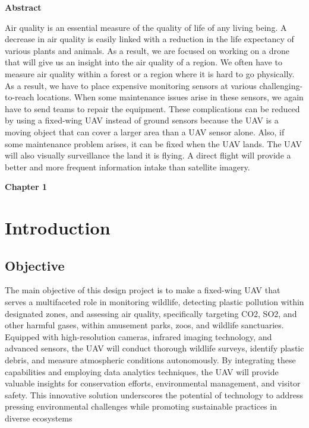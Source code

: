 \documentclass[12 pt]{article}
\begin{document}
\newpage

\vspace{\fill}
\noindent

\begin{midpage}
    \centering
\textbf{Abstract} \\ \vspace{0.5 cm}

Air quality is an essential measure of the quality of life of any living being. A decrease in air quality is easily linked with a reduction in the life expectancy of various plants and animals.
As a result, we are focused on working on a drone that will give us an insight into the air quality of a region. 
We often have to measure air quality within a forest or a region where it is hard to go physically. As a result, we have to place expensive monitoring sensors at various challenging-to-reach locations. 
When some maintenance issues arise in these sensors, we again have to send teams to repair the equipment.
These complications can be reduced by using a fixed-wing UAV instead of ground sensors because the UAV is a moving object that can cover a larger area than a UAV sensor alone. Also, if some maintenance problem arises, it can be fixed when the UAV lands.
The UAV will also visually surveillance the land it is flying. A direct flight will provide a better and more frequent information intake than satellite imagery.
\end{midpage}

\vspace{\fill}


\newpage

\tableofcontents

\newpage

\thispagestyle{empty}
\listoffigures
\listoftables
\newpage

\textbf{\Huge{Chapter 1}}
\section{Introduction}

\subsection{Objective}
The main objective of this design project is to make a fixed-wing UAV that serves a multifaceted role in monitoring wildlife, detecting plastic pollution within designated zones, and assessing air quality, specifically targeting CO2, SO2, and other harmful gases, within amusement parks, zoos, and wildlife sanctuaries. Equipped with high-resolution cameras, infrared imaging technology, and advanced sensors, the UAV will conduct thorough wildlife surveys, identify plastic debris, and measure atmospheric conditions autonomously. By integrating these capabilities and employing data analytics techniques, the UAV will provide valuable insights for conservation efforts, environmental management, and visitor safety. This innovative solution underscores the potential of technology to address pressing environmental challenges while promoting sustainable practices in diverse ecosystems
\end{document}
